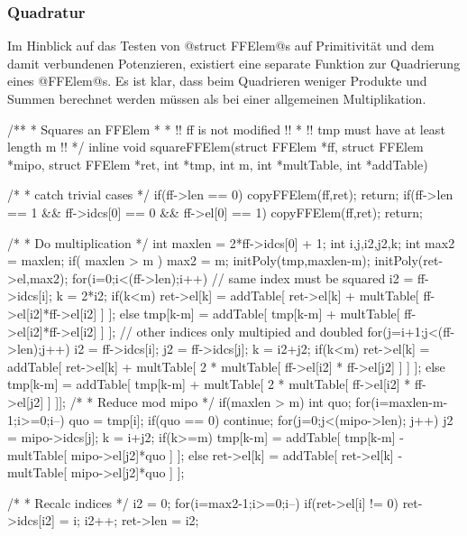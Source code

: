 \subsubsection{Quadratur}
Im Hinblick auf das Testen von @struct FFElem@s auf Primitivität und dem damit
verbundenen Potenzieren, existiert eine separate Funktion zur Quadrierung eines 
@FFElem@s. Es ist klar, dass beim Quadrieren weniger Produkte und Summen
berechnet werden müssen als bei einer allgemeinen Multiplikation.
\begin{ccode}[caption={Aus \url{../Sage/enumeratePCNs.c}}]
/**
 * Squares an FFElem
 *
 * !! ff is not modified !!
 * !! tmp must have at least length m !!
 */
inline void squareFFElem(struct FFElem *ff, struct FFElem *mipo,
        struct FFElem *ret, int *tmp, int m,
        int *multTable, int *addTable){
    /* 
     * catch trivial cases
     */
    if(ff->len == 0){
        copyFFElem(ff,ret);
        return;
    }
    if(ff->len == 1 && ff->idcs[0] == 0 && ff->el[0] == 1){
        copyFFElem(ff,ret);
        return;
    }

    /*
     * Do multiplication
     */
    int maxlen = 2*ff->idcs[0] + 1;
    int i,j,i2,j2,k;
    int max2 = maxlen;
    if( maxlen > m ){
        max2 = m;
        initPoly(tmp,maxlen-m);
    }
    initPoly(ret->el,max2);
    for(i=0;i<(ff->len);i++){
        // same index must be squared
        i2 = ff->idcs[i];
        k = 2*i2;
        if(k<m){
            ret->el[k] = addTable[ ret->el[k] + 
                multTable[ ff->el[i2]*ff->el[i2] ] ];
        }else{
            tmp[k-m] = addTable[ tmp[k-m] +
                multTable[ ff->el[i2]*ff->el[i2] ] ];
        }
        // other indices only multipied and doubled
        for(j=i+1;j<(ff->len);j++){
            i2 = ff->idcs[i];
            j2 = ff->idcs[j];
            k = i2+j2;
            if(k<m){
                ret->el[k] = addTable[ ret->el[k] + 
                    multTable[ 2 * multTable[ ff->el[i2] * ff->el[j2] ] ] ];
            }else{
                tmp[k-m] = addTable[ tmp[k-m] +
                    multTable[ 2 * multTable[ ff->el[i2] * ff->el[j2] ] ]];
            }
        }
    }
    /*
     * Reduce mod mipo
     */
    if(maxlen > m){
        int quo;
        for(i=maxlen-m-1;i>=0;i--){
            quo = tmp[i];
            if(quo == 0) continue;
            for(j=0;j<(mipo->len); j++){
                j2 = mipo->idcs[j];
                k = i+j2;
                if(k>=m){
                    tmp[k-m] = addTable[ tmp[k-m] - 
                        multTable[ mipo->el[j2]*quo ] ];
                }else{
                    ret->el[k] = addTable[ ret->el[k] - 
                        multTable[ mipo->el[j2]*quo ] ];
                }
            }
        }
    }

    /*
     * Recalc indices
     */
    i2 = 0;
    for(i=max2-1;i>=0;i--){
        if(ret->el[i] != 0){
            ret->idcs[i2] = i;
            i2++;
        }
    }
    ret->len = i2;
}
\end{ccode}


